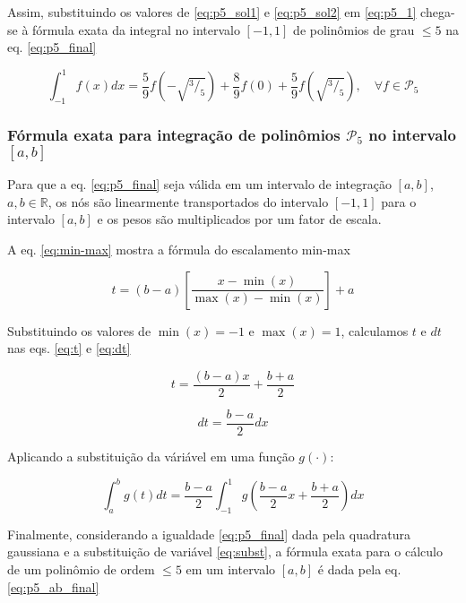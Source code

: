 \documentclass[a4,12pt]{horizon-theme}
\begin{document}
Assim, substituindo os valores de \eqref{eq:p5_sol1} e \eqref{eq:p5_sol2} em \eqref{eq:p5_1} chega-se à fórmula exata da integral no intervalo $[-1, 1]$ de polinômios de grau $\le 5$ na eq. \eqref{eq:p5_final}

\begin{equation}\label{eq:p5_final}
  \displaystyle\int_{-1}^{1} f(x)dx = \frac{5}{9}f(-\sqrt{^3/_5}) + \frac{8}{9}f(0) + \frac{5}{9}f(\sqrt{^3/_5}),\quad \forall f \in \mathcal{P}_5
\end{equation}



\subsubsection{Fórmula exata para integração de polinômios $\mathcal{P}_5$ no intervalo $[a, b]$}
Para que a eq. \eqref{eq:p5_final} seja válida em um intervalo de integração $[a, b]$, $a, b \in \mathbb{R}$,  os nós são linearmente transportados do intervalo $[-1, 1]$ para o intervalo $[a, b]$ e os pesos são multiplicados por um fator de escala.

A eq. \eqref{eq:min-max} mostra a fórmula do escalamento min-max

\begin{equation}\label{eq:min-max}
  t = (b-a) \left[\frac{x - \min(x)}{\max(x) - \min(x)}\right] + a
\end{equation}

Substituindo os valores de $\min(x) = -1$ e $\max(x) = 1$, calculamos $t$ e $dt$ nas eqs. \eqref{eq:t} e \eqref{eq:dt}

\begin{equation}\label{eq:t}
  t = \frac{(b-a)x}{2} + \frac{b+a}{2}
\end{equation}


\begin{equation}\label{eq:dt}
  dt = \frac{b-a}{2}dx
\end{equation}

Aplicando a substituição da váriável em uma função $g(\cdot)$:

\begin{equation}\label{eq:subst}
  \int_a^b g(t)dt = \frac{b-a}{2}\int_{-1}^{1} g\left(\frac{b-a}{2}x + \frac{b+a}{2}\right)dx
\end{equation}

Finalmente, considerando a igualdade \eqref{eq:p5_final} dada pela quadratura gaussiana e a substituição de variável \eqref{eq:subst}, a fórmula exata para o cálculo de um polinômio de ordem $\le 5$ em um intervalo $[a, b]$ é dada pela eq. \eqref{eq:p5_ab_final}
\end{document}
